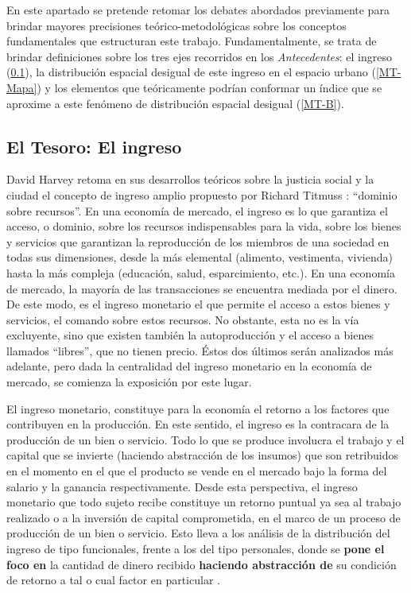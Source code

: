 En este apartado se pretende retomar los debates abordados previamente para brindar mayores precisiones teórico-metodológicas sobre los conceptos fundamentales que estructuran este trabajo. Fundamentalmente, se trata de brindar definiciones sobre los tres ejes recorridos en los \textit{Antecedentes}: el ingreso (\ref{MT-Tesoro}), la distribución espacial desigual de este ingreso en el espacio urbano (\ref{MT-Mapa}) y los elementos que teóricamente podrían conformar un índice que se aproxime a este fenómeno de distribución espacial desigual (\ref{MT-B}).
	
\subsection{El Tesoro: El ingreso}\label{MT-Tesoro}
	
David Harvey \citeyear{harvey} retoma en sus desarrollos teóricos sobre la justicia social y la ciudad el concepto de ingreso amplio propuesto por Richard Titmuss \citeyear{titmuss}: “dominio sobre recursos”. En una economía de mercado, el ingreso es lo que garantiza el acceso, o dominio, sobre los recursos indispensables para la vida, sobre los bienes y servicios que garantizan la reproducción de los miembros de una sociedad en todas sus dimensiones, desde la más elemental (alimento, vestimenta, vivienda) hasta la más compleja (educación, salud, esparcimiento, etc.). En una economía de mercado, la mayoría de las transacciones se encuentra mediada por el dinero. De este modo, es el ingreso monetario el que permite el acceso a estos bienes y servicios, el comando sobre estos recursos. No obstante, esta no es la vía excluyente, sino que existen también la autoproducción y el acceso a bienes llamados “libres”, que no tienen precio. Éstos dos últimos serán analizados más adelante, pero dada la centralidad del ingreso monetario en la economía de mercado, se comienza la exposición por este lugar.
	
El ingreso monetario, constituye para la economía el retorno a los factores que contribuyen en la producción. En este sentido, el ingreso es la contracara de la producción de un bien o servicio. Todo lo que se produce involucra el trabajo y el capital que se invierte (haciendo abstracción de los insumos) que son retribuidos en el momento en el que el producto se vende en el mercado bajo la forma del salario y la ganancia respectivamente. Desde esta perspectiva, el ingreso monetario que todo sujeto recibe constituye un retorno puntual ya sea al trabajo realizado o a la inversión de capital comprometida, en el marco de un proceso de producción de un bien o servicio. Esto lleva a los análisis de la distribución del ingreso de tipo funcionales, frente a los del tipo personales, donde se \textbf{pone el foco en} la cantidad de dinero recibido \textbf{haciendo abstracción de} su condición de retorno a tal o cual factor en particular \cite{lindemboim,monza,altimir1986,altimir2002,conade}.
	
